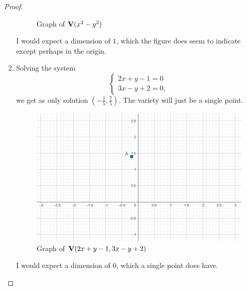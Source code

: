 \begin{proof}
\begin{enumerate}
\begin{figure}[H]
            \caption{Graph of $\mathbf{V}(x^2 - y^2)$}
            \label{fig:sec1-2-ex1b}
        \end{figure}
        I would expect a dimension of $1$, which the figure does seem to indicate except perhaps in the origin.
        \item Solving the system
        $$\left\{\begin{array}{l}
        2x + y - 1 = 0\\
        3x - y + 2 = 0,
        \end{array}\right.$$
        we get as only solution $\left(-\frac{1}{5},\frac{7}{5}\right)$. The variety will just be a single point.
        \begin{figure}[H]
            \centering
            \includegraphics[width=0.5\linewidth]{cox-little-oshea/assets/sec1-2-ex1c.png}
            \caption{Graph of $\mathbf{V}(2x+y-1, 3x - y + 2)$}
            \label{fig:sec1-2-ex1c}
        \end{figure}
        I would expect a dimension of $0$, which a single point does have.
    \end{enumerate}
\end{proof}

